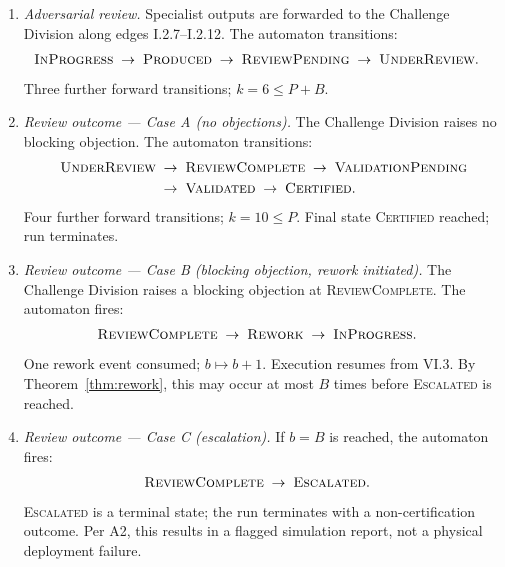 \documentclass[12pt]{article}
\theoremstyle{definition}
\begin{document}
\begin{enumerate}
    \item[VI.4] \emph{Adversarial review.}  Specialist outputs are
                forwarded to the Challenge Division along edges
                I.2.7--I.2.12.  The automaton transitions:
                \begin{align}
                    \textsc{InProgress}
                    &\;\to\; \textsc{Produced}
                    \;\to\; \textsc{ReviewPending}
                    \;\to\; \textsc{UnderReview}.
                    \notag
                \end{align}
                Three further forward transitions; $k = 6 \leq P + B$.
                \checkmark

    \item[VI.5] \emph{Review outcome --- Case A (no objections).}
                The Challenge Division raises no blocking objection.
                The automaton transitions:
                \begin{align}
                    \textsc{UnderReview}
                    &\;\to\; \textsc{ReviewComplete}
                              \;\to\; \textsc{ValidationPending} \\
                              &\;\to\; \textsc{Validated}
                              \;\to\; \textsc{Certified}.
                    \notag
                \end{align}
                Four further forward transitions; $k = 10 \leq P$.
                Final state \textsc{Certified} reached; run terminates.
                \checkmark

    \item[VI.6] \emph{Review outcome --- Case B (blocking objection,
                rework initiated).}  The Challenge Division raises a
                blocking objection at \textsc{ReviewComplete}.
                The automaton fires:
                \begin{align}
                    \textsc{ReviewComplete}
                    &\;\to\; \textsc{Rework}
                    \;\to\; \textsc{InProgress}.
                    \notag
                \end{align}
                One rework event consumed; $b \mapsto b + 1$.
                Execution resumes from VI.3.  By
                Theorem~\ref{thm:rework}, this may occur at most
                $B$ times before \textsc{Escalated} is reached.
                \checkmark

    \item[VI.7] \emph{Review outcome --- Case C (escalation).}
                If $b = B$ is reached, the automaton fires:
                \begin{align}
                    \textsc{ReviewComplete}
                    &\;\to\; \textsc{Escalated}.
                    \notag
                \end{align}
                \textsc{Escalated} is a terminal state; the run
                terminates with a non-certification outcome.  Per A2,
                this results in a flagged simulation report, not a
                physical deployment failure. \checkmark


\end{enumerate}
\end{document}
